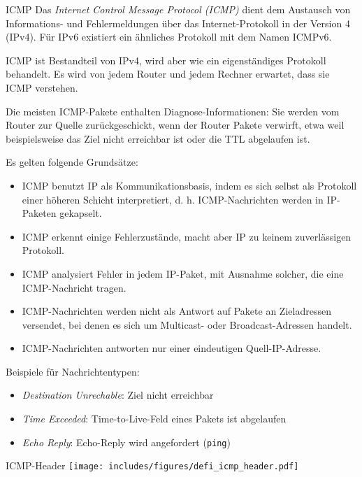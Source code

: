 \begin{defi}{ICMP}
    Das \emph{Internet Control Message Protocol (ICMP)} dient dem Austausch von Informations- und Fehlermeldungen über das Internet-Protokoll in der Version 4 (IPv4). Für IPv6 existiert ein ähnliches Protokoll mit dem Namen ICMPv6.

    ICMP ist Bestandteil von IPv4, wird aber wie ein eigenständiges Protokoll behandelt.
    Es wird von jedem Router und jedem Rechner erwartet, dass sie ICMP verstehen.

    Die meisten ICMP-Pakete enthalten Diagnose-Informationen: Sie werden vom Router zur Quelle zurückgeschickt, wenn der Router Pakete verwirft, etwa weil beispielsweise das Ziel nicht erreichbar ist oder die TTL abgelaufen ist.

    Es gelten folgende Grundsätze:
    \begin{itemize}
        \item ICMP benutzt IP als Kommunikationsbasis, indem es sich selbst als Protokoll einer höheren Schicht interpretiert, d. h. ICMP-Nachrichten werden in IP-Paketen gekapselt.
        \item ICMP erkennt einige Fehlerzustände, macht aber IP zu keinem zuverlässigen Protokoll.
        \item ICMP analysiert Fehler in jedem IP-Paket, mit Ausnahme solcher, die eine ICMP-Nachricht tragen.
        \item ICMP-Nachrichten werden nicht als Antwort auf Pakete an Zieladressen versendet, bei denen es sich um Multicast- oder Broadcast-Adressen handelt.
        \item ICMP-Nachrichten antworten nur einer eindeutigen Quell-IP-Adresse.
    \end{itemize}

    Beispiele für Nachrichtentypen:
    \begin{itemize}
        \item \emph{Destination Unrechable}: Ziel nicht erreichbar
        \item \emph{Time Exceeded}: Time-to-Live-Feld eines Pakets ist abgelaufen
        \item \emph{Echo Reply}: Echo-Reply wird angefordert (\texttt{ping})
    \end{itemize}
\end{defi}

\begin{defi}{ICMP-Header}
    \centering
    \texttt{[image: includes/figures/defi\_icmp\_header.pdf]}
\end{defi}

